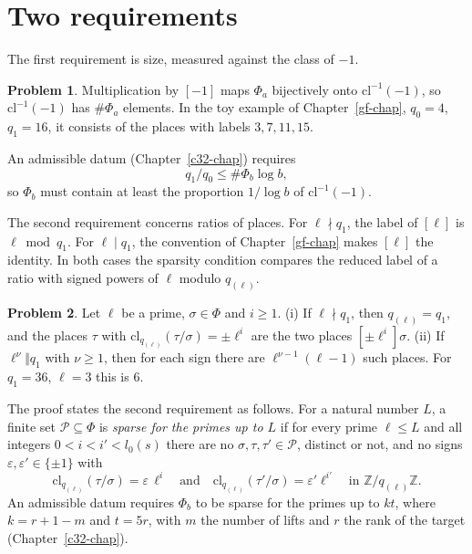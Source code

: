 \documentclass[reqno]{amsart}
\newcounter{chap}
\theoremstyle{definition}
\newtheorem{problem}{Problem}[section]
\theoremstyle{plain}
\newcommand{\Z}{\mathbb{Z}}
\newcommand{\Pc}{\mathcal{P}}
\begin{document}
\section{Two requirements}\label{sec:two}

The first requirement is size, measured against the class of \(-1\).

\begin{problem}\label{pr:avg-density}
Multiplication by \([-1]\) maps \(\Phi_a\) bijectively onto \(\mathrm{cl}^{-1}(-1)\), so \(\mathrm{cl}^{-1}(-1)\) has \(\#\Phi_a\) elements.  In the toy example of Chapter~\ref{gf-chap}, \(q_0 = 4\), \(q_1 = 16\), it consists of the places with labels \(3, 7, 11, 15\).
\end{problem}

An admissible datum (Chapter~\ref{c32-chap}) requires
\begin{equation}\label{eq:density}
  q_1/q_0 \le \#\Phi_b \log b ,
\end{equation}
so \(\Phi_b\) must contain at least the proportion \(1/\log b\) of \(\mathrm{cl}^{-1}(-1)\).

The second requirement concerns ratios of places.  For \(\ell \nmid q_1\), the label of \([\ell]\) is \(\ell \bmod q_1\).  For \(\ell \mid q_1\), the convention of Chapter~\ref{gf-chap} makes \([\ell]\) the identity.  In both cases the sparsity condition compares the reduced label of a ratio with signed powers of \(\ell\) modulo \(q_{(\ell)}\).

\begin{problem}\label{pr:frob-prog}
Let \(\ell\) be a prime, \(\sigma \in \Phi\) and \(i \ge 1\).  (i) If \(\ell \nmid q_1\), then \(q_{(\ell)} = q_1\), and the places \(\tau\) with \(\mathrm{cl}_{q_{(\ell)}}(\tau/\sigma) = \pm\ell^i\) are the two places \([\pm\ell^i]\sigma\).  (ii) If \(\ell^\nu \Vert q_1\) with \(\nu \ge 1\), then for each sign there are \(\ell^{\nu-1}(\ell-1)\) such places.  For \(q_1 = 36\), \(\ell = 3\) this is \(6\).
\end{problem}

The proof states the second requirement as follows.  For a natural number \(L\), a finite set \(\Pc \subseteq \Phi\) is \emph{sparse for the primes up to \(L\)} if for every prime \(\ell \le L\) and all integers \(0 < i < i' < l_0(s)\) there are no \(\sigma, \tau, \tau' \in \Pc\), distinct or not, and no signs \(\varepsilon, \varepsilon' \in \{\pm1\}\) with
\[
  \mathrm{cl}_{q_{(\ell)}}(\tau/\sigma) = \varepsilon\,\ell^i \quad\text{and}\quad \mathrm{cl}_{q_{(\ell)}}(\tau'/\sigma) = \varepsilon'\ell^{i'} \quad\text{in } \Z/q_{(\ell)}\Z.
\]
An admissible datum requires \(\Phi_b\) to be sparse for the primes up to \(kt\), where \(k = r+1-m\) and \(t = 5r\), with \(m\) the number of lifts and \(r\) the rank of the target (Chapter~\ref{c32-chap}).
\end{document}
